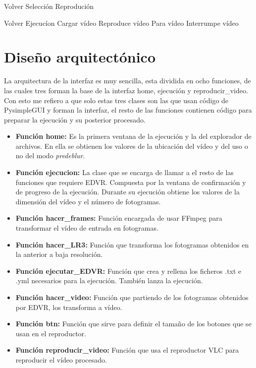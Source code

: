 \FloatBarrier
\begin{algorithm}[!h]
{
Volver Selección
}
{
Reprodución
}
\caption{Proceso de Ejecución }
\end{algorithm}
\FloatBarrier

\FloatBarrier
\begin{algorithm}[!h]
{
Volver Ejecucíon
}
{
Cargar vídeo
}
{
Reproduce vídeo
}
{
Para vídeo
}
{
Interrumpe vídeo
}
\caption{Proceso de Reproducción del vídeo procesado }
\end{algorithm}
\FloatBarrier


\section{Diseño arquitectónico}

La arquitectura de la interfaz es muy sencilla, esta dividida en ocho funciones, de las cuales tres forman la base de la interfaz home, ejecución y reproducir\_video. Con esto me refiero a que solo estas tres clases son las que usan código de PysimpleGUI y forman la interfaz, el resto de las funciones contienen código para preparar la ejecución y su posterior procesado.
\begin{itemize}
  \item \textbf{Función home:} Es la primera ventana de la ejecución y la del explorador de archivos. En ella se obtienen los valores de la ubicación del vídeo y del uso o no del modo \emph{predeblur}.
  \item \textbf{Función ejecucion:} La clase que se encarga de llamar a el resto de las funciones que requiere EDVR. Compuesta por la ventana de confirmación y de progreso de la ejecución. Durante su ejecución obtiene los valores de la dimensión del vídeo y el número de fotogramas.
  \item \textbf{Función hacer\_frames:} Función encargada de usar FFmpeg para transformar el vídeo de entrada en fotogramas.
  \item \textbf{Función hacer\_LR3:} Función que transforma los fotogramas obtenidos en la anterior a baja resolución.
  \item \textbf{Función ejecutar\_EDVR:} Función que crea y rellena los ficheros .txt e .yml necesarios para la ejecución. También lanza la ejecución.
  \item \textbf{Función hacer\_video:} Función que partiendo de los fotogramas obtenidos por EDVR, los transforma a vídeo.
  \item \textbf{Función btn:} Función que sirve para definir el tamaño de los botones que se usan en el reproductor.
  \item \textbf{Función reproducir\_video:} Función que usa el reproductor VLC para reproducir el vídeo procesado.
\end{itemize}
   
